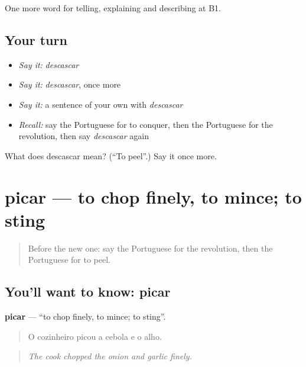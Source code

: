 \begin{grammarlens}[title={What you've built}]
One more word for telling, explaining and describing at B1.
\end{grammarlens}

\subsection*{Your turn}
\begin{itemize}
\raggedright
  \item \emph{Say it:} \emph{descascar}
  \item \emph{Say it:} \emph{descascar}, once more
  \item \emph{Say it:} a sentence of your own with \emph{descascar}
  \item \emph{Recall:} say the Portuguese for to conquer, then the Portuguese for the revolution, then say \emph{descascar} again
\end{itemize}

\begin{tcolorbox}[breakable,colback=teal!4,colframe=teal!35!black,title={Before you move on}]
What does descascar mean? (\textquotedblleft{}To peel\textquotedblright{}.) Say it once more.
\end{tcolorbox}
\section[picar]{picar — to chop finely, to mince; to sting}

\label{lesson:PT-C330-picar}



\begin{quote}
Before the new one: say the Portuguese for the revolution, then the Portuguese for to peel.
\end{quote}

\subsection*{You'll want to know: picar}
\textbf{picar} — \textquotedblleft{}to chop finely, to mince; to sting\textquotedblright{}.

\begin{quote}
O cozinheiro picou a cebola e o alho.
\end{quote}

\begin{quote}
\emph{The cook chopped the onion and garlic finely.}
\end{quote}

